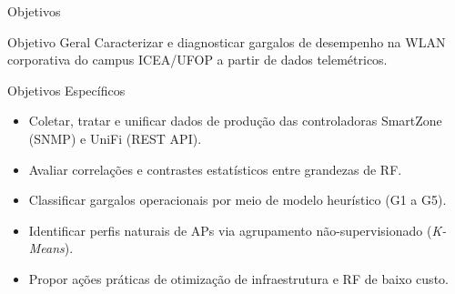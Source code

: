 \documentclass[10pt,brazil]{beamer}
\begin{document}
    \begin{frame}{Objetivos}
        \begin{block}{Objetivo Geral}
            Caracterizar e diagnosticar gargalos de desempenho na WLAN corporativa do campus ICEA/UFOP a partir de dados telemétricos.
        \end{block}
        \begin{block}{Objetivos Específicos}
            \begin{itemize}
                \item Coletar, tratar e unificar dados de produção das controladoras SmartZone (SNMP) e UniFi (REST API).
                \item Avaliar correlações e contrastes estatísticos entre grandezas de RF.
                \item Classificar gargalos operacionais por meio de modelo heurístico (G1 a G5).
                \item Identificar perfis naturais de APs via agrupamento não-supervisionado (\textit{K-Means}).
                \item Propor ações práticas de otimização de infraestrutura e RF de baixo custo.
            \end{itemize}
        \end{block}
    \end{frame}
\end{document}
